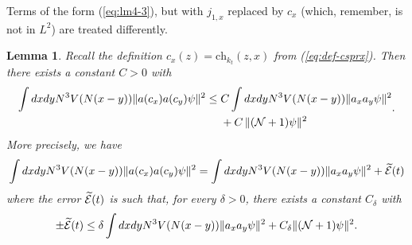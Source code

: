 \documentclass[11pt,a4paper]{article}
\newtheorem{lemma}[thm]{Lemma}
\newcommand{\wt}{\widetilde}
\newcommand{\cE}{{\cal E}}
\newcommand{\cN}{{\cal N}}
\begin{document}
Terms of the form (\ref{eq:lm4-3}), but with $j_{1,x}$ replaced by $c_x$ (which, remember, is not in $L^2$) are treated differently.
\begin{lemma}\label{lm:4b}
Recall the definition $c_x (z) = \text{ch}_{k_t} (z,x)$ from (\ref{eq:def-csprx}). Then there exists a constant $C>0$ with
\begin{equation}\label{eq:lm4b-1}
\begin{split}
\int dx dy N^3 V(N(x-y)) \| a (c_x) a(c_y) \psi \|^2 \leq \; &C \int dx dy N^3 V (N(x-y)) \| a_x a_y \psi \|^2 \\ &+ C\, \| (\cN+1) \psi \|^2 \end{split}. \end{equation}
More precisely, we have 
\begin{equation}\label{eq:lm4b-2} \int dx dy N^3 V(N(x-y)) \| a (c_x) a (c_y) \psi \|^2 = \int dx dy N^3 V(N (x-y)) \| a_x a_y \psi \|^2 + \wt{\cE} (t) \end{equation}
where the error $\wt{\cE} (t)$ is such that, for every $\delta > 0$, there exists a constant $C_\delta$ 
with
\[ \pm \wt{\cE} (t) \leq \delta \int dx dy N^3 V (N (x-y)) \| a_x a_y \psi \|^2 + C_\delta \| (\cN+1) \psi \|^2. \]
\end{lemma}
\end{document}
